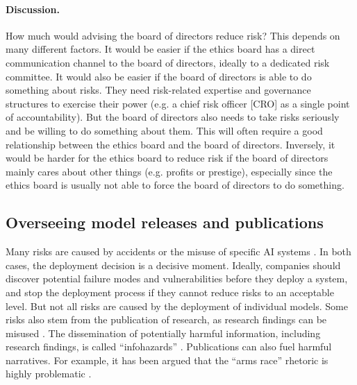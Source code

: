 \documentclass{article}
\begin{document}
\paragraph{Discussion.} How much would advising the board of directors reduce risk? This depends on many different factors. It would be easier if the ethics board has a direct communication channel to the board of directors, ideally to a dedicated risk committee. It would also be easier if the board of directors is able to do something about risks. They need risk-related expertise and governance structures to exercise their power (e.g. a chief risk officer [CRO] as a single point of accountability). But the board of directors also needs to take risks seriously and be willing to do something about them. This will often require a good relationship between the ethics board and the board of directors. Inversely, it would be harder for the ethics board to reduce risk if the board of directors mainly cares about other things (e.g. profits or prestige), especially since the ethics board is usually not able to force the board of directors to do something.

\subsection{Overseeing model releases and publications}\label{Ch:2:2:overseeing}

Many risks are caused by accidents \cite{amodei2016concrete, arnold2021aiaccidents} or the misuse of specific AI systems \cite{brundage2018malicious, goldstein2023generative, anderljung2023protecting}. In both cases, the deployment decision is a decisive moment. Ideally, companies should discover potential failure modes and vulnerabilities before they deploy a system, and stop the deployment process if they cannot reduce risks to an acceptable level. But not all risks are caused by the deployment of individual models. Some risks also stem from the publication of research, as research findings can be misused \cite{urbina2022dual, brundage2018malicious, goldstein2023generative, anderljung2023protecting, ashurst2022ai, shevlane2020offense, bostrom2019vulnerable}. The dissemination of potentially harmful information, including research findings, is called “infohazards” \cite{bostrom2011information, leahy2022conjecture}. Publications can also fuel harmful narratives. For example, it has been argued that the “arms race” rhetoric is highly problematic \cite{cave2018ai}.
\end{document}
